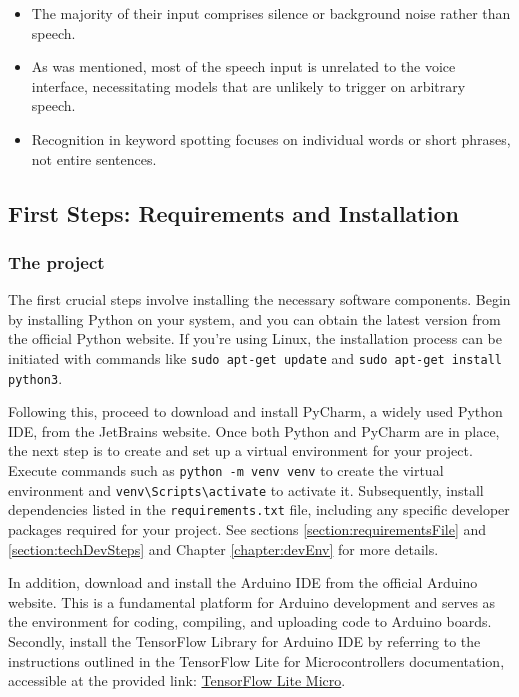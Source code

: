 \begin{itemize}
	\item The majority of their input comprises silence or background noise rather than speech.
	\item As was mentioned, most of the speech input is unrelated to the voice interface, necessitating models that are unlikely to trigger on arbitrary speech.
	\item Recognition in keyword spotting focuses on individual words or short phrases, not entire sentences.
\end{itemize}


\subsection{First Steps: Requirements and Installation}

\subsubsection{The project}

The first crucial steps involve installing the necessary software components. Begin by installing Python on your system, and you can obtain the latest version from the official Python website. If you're using Linux, the installation process can be initiated with commands like \texttt{sudo apt-get update} and \texttt{sudo apt-get install python3}.

Following this, proceed to download and install PyCharm, a widely used Python IDE, from the JetBrains website. Once both Python and PyCharm are in place, the next step is to create and set up a virtual environment for your project. Execute commands such as \texttt{python -m venv venv} to create the virtual environment and \texttt{venv\textbackslash Scripts\textbackslash activate} to activate it. Subsequently, install dependencies listed in the \texttt{requirements.txt} file, including any specific developer packages required for your project. See sections \ref{section:requirementsFile} and \ref{section:techDevSteps} and Chapter \ref{chapter:devEnv} for more details.

In addition, download and install the Arduino IDE from the official Arduino website. This is a fundamental platform for Arduino development and serves as the environment for coding, compiling, and uploading code to Arduino boards. Secondly, install the TensorFlow Library for Arduino IDE by referring to the instructions outlined in the TensorFlow Lite for Microcontrollers documentation, accessible at the provided link: \href{https://github.com/tensorflow/tflite-micro-arduino-examples}{TensorFlow Lite Micro}.

